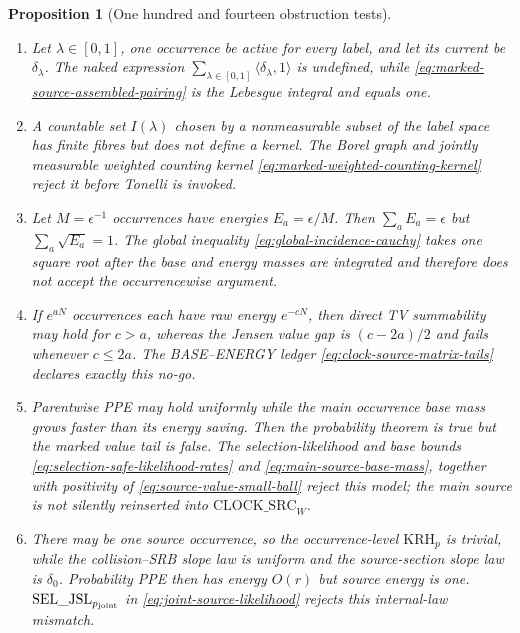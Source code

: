 \documentclass[11pt]{article}
\newtheorem{proposition}[theorem]{Proposition}
\begin{document}
\begin{proposition}[One hundred and fourteen obstruction tests]
\begin{enumerate}[label=\textup{(T\arabic*)}]
      from a probability first-hit partition.  The canonical owner map in
      Definition~\ref{def:source-incidence-space} identifies physical
      occurrences, not event supports, and therefore retains both.
\item Let $\lambda\in[0,1]$, one occurrence be active for every label, and
      let its current be $\delta_\lambda$.  The naked expression
      $\sum_{\lambda\in[0,1]}\langle\delta_\lambda,1\rangle$ is undefined,
      while \eqref{eq:marked-source-assembled-pairing} is the Lebesgue
      integral and equals one.
\item A countable set $I(\lambda)$ chosen by a nonmeasurable subset of the
      label space has finite fibres but does not define a kernel.  The Borel
      graph and jointly measurable weighted counting kernel
      \eqref{eq:marked-weighted-counting-kernel} reject it before Tonelli is
      invoked.
\item Let $M=\epsilon^{-1}$ occurrences have energies
      $E_a=\epsilon/M$.  Then $\sum_aE_a=\epsilon$ but
      $\sum_a\sqrt{E_a}=1$.  The global inequality
      \eqref{eq:global-incidence-cauchy} takes one square root after the base
      and energy masses are integrated and therefore does not accept the
      occurrencewise argument.
\item If $e^{aN}$ occurrences each have raw energy $e^{-cN}$, then direct TV
      summability may hold for $c>a$, whereas the Jensen value gap is
      $(c-2a)/2$ and fails whenever $c\le2a$.  The BASE--ENERGY ledger
      \eqref{eq:clock-source-matrix-tails} declares exactly this no-go.
\item Parentwise PPE may hold uniformly while the main occurrence base mass
      grows faster than its energy saving.  Then the probability theorem is
      true but the marked value tail is false.  The selection-likelihood and
      base bounds \eqref{eq:selection-safe-likelihood-rates} and
      \eqref{eq:main-source-base-mass}, together with positivity of
      \eqref{eq:source-value-small-ball} reject this model; the main source
      is not silently reinserted into $\mathrm{CLOCK\_SRC}_{W}$.
\item There may be one source occurrence, so the occurrence-level
      $\mathrm{KRH}_p$ is trivial, while the collision--SRB slope law is
      uniform and the source-section slope law is $\delta_0$.  Probability
      PPE then has energy $O(r)$ but source energy is one.
      $\mathrm{SEL\_JSL}_{p_{\rm joint}}$ in
      \eqref{eq:joint-source-likelihood} rejects this internal-law mismatch.

\end{enumerate}
\end{proposition}
\end{document}
